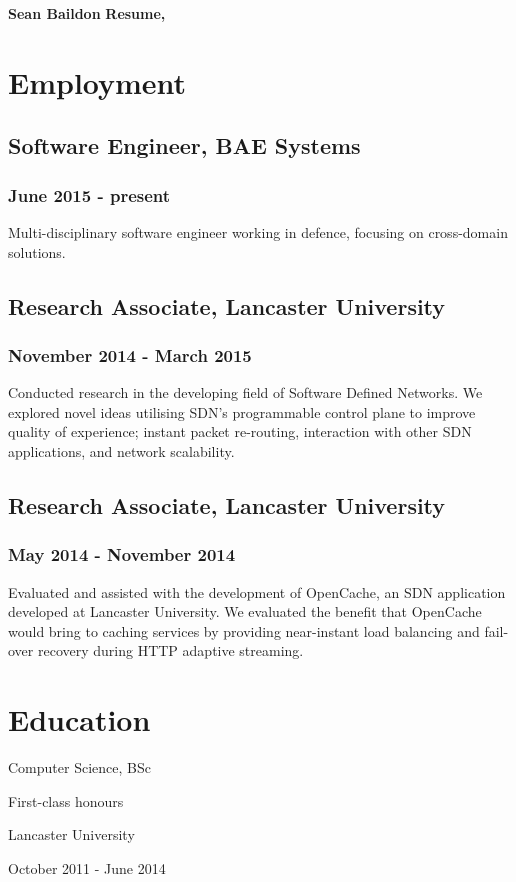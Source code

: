 \documentclass[a4paper,12pt]{article}
\begin{document}
\large
\noindent\textbf{Sean Baildon}
\hfill
\noindent\textbf{Resume, \the\year}
\normalsize

\vspace{4ex}
\hrulefill
\vspace{3ex}

\begin{multicols*}{2}

\section*{Employment}
\subsection*{Software Engineer, BAE Systems}
\subsubsection*{June 2015 - present}
Multi-disciplinary software engineer working in defence, focusing on cross-domain solutions.
\subsection*{Research Associate, Lancaster University}
\subsubsection*{November 2014 - March 2015}
Conducted research in the developing field of Software Defined Networks. We explored novel ideas utilising SDN's programmable control plane to improve quality of experience; instant packet re-routing, interaction with other SDN applications, and network scalability.
\subsection*{Research Associate, Lancaster University}
\subsubsection*{May 2014 - November 2014}
Evaluated and assisted with the development of OpenCache, an SDN application developed at Lancaster University. We evaluated the benefit that OpenCache would bring to caching services by providing near-instant load balancing and fail-over recovery during HTTP adaptive streaming.

\section*{Education}
Computer Science, BSc\par
First-class honours\par
Lancaster University\par
October 2011 - June 2014


\end{multicols*}
\end{document}
